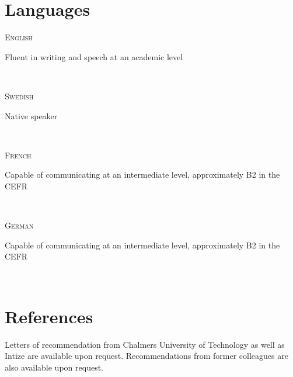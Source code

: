 \documentclass[letterpaper,
		10pt]{article}
\newcommand{\entry}[4]{
\ifthenelse{\isempty{#3}}
{\slimentry{#1}{#2}}{

\begin{minipage}[t]{.15\linewidth}
\hfill \textsc{#1}
\end{minipage}
\hfill\vline\hfill
\begin{minipage}[t]{.80\linewidth}
{\bf#2}\\\textit{#3} \small{#4}
\end{minipage}\\
\vspace{.2cm}
}}
\newcommand{\slimentry}[2]{
\begin{minipage}[t]{.15\linewidth}
\hfill \textsc{#1}
\end{minipage}
\hfill\vline\hfill
\begin{minipage}[t]{.80\linewidth}
#2
\end{minipage}\\
\vspace{.25cm}
}
\newcommand{\sentry}[2]{
\begin{minipage}[t]{.15\linewidth}
\hfill \textsc{#1}
\end{minipage}
\hfill\vline\hfill
\begin{minipage}[t]{.80\linewidth}
#2
\end{minipage}\\
\vspace{-.15cm}
}%
\begin{document}
\section{Languages}

\sentry{English}{Fluent in writing and speech at an academic level}

\sentry{Swedish}{Native speaker}

\sentry{French}{Capable of communicating at an intermediate level, approximately B2 in the CEFR}

\sentry{German}{Capable of communicating at an intermediate level, approximately B2 in the CEFR}

\section{References}
    
Letters of recommendation from Chalmers University of Technology as well as Intize are available upon request.
Recommendations from former colleagues are also available upon request.
\end{document}
